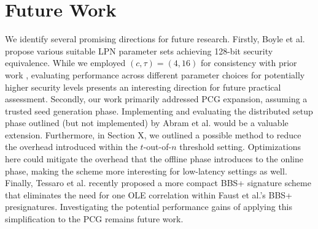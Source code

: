 \section{Future Work}
We identify several promising directions for future research. Firstly, Boyle et al. \cite{boyle2020efficient} propose various suitable LPN parameter sets achieving 128-bit security equivalence. While we employed $(c,\tau)=(4,16)$ for consistency with prior work \cite{abram2022low}, evaluating performance across different parameter choices for potentially higher security levels presents an interesting direction for future practical assessment. Secondly, our work primarily addressed PCG expansion, assuming a trusted seed generation phase. Implementing and evaluating the distributed setup phase outlined (but not implemented) by Abram et al. \cite{abram2022low} would be a valuable extension. Furthermore, in Section X, we outlined a possible method to reduce the overhead introduced within the $t$-out-of-$n$ threshold setting. Optimizations here could mitigate the overhead that the offline phase introduces to the online phase, making the scheme more interesting for low-latency settings as well. Finally, Tessaro et al. \cite{tessaro2023revisiting} recently proposed a more compact BBS+ signature scheme that eliminates the need for one OLE correlation within Faust et al.'s BBS+ presignatures. Investigating the potential performance gains of applying this simplification to the PCG remains future work.